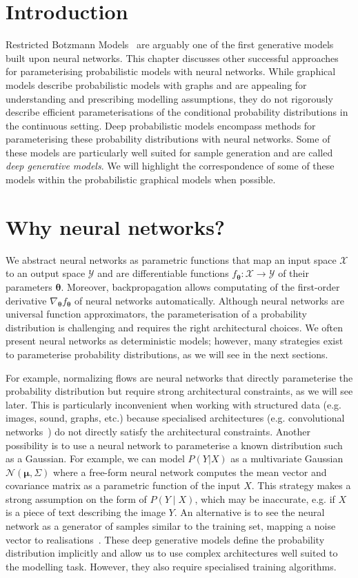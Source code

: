 \section{Introduction}
Restricted Botzmann Models~\citep{hinton2002training} are arguably one of the first generative models built upon neural networks. This chapter discusses other successful approaches for parameterising probabilistic models with neural networks. While graphical models describe probabilistic models with graphs and are appealing for understanding and prescribing modelling assumptions, they do not rigorously describe efficient parameterisations of the conditional probability distributions in the continuous setting. Deep probabilistic models encompass methods for parameterising these probability distributions with neural networks. Some of these models are particularly well suited for sample generation and are called \textit{deep generative models}. We will highlight the correspondence of some of these models within the probabilistic graphical models when possible.

\section{Why neural networks?}
We abstract neural networks as parametric functions that map an input space $\mathcal{X}$ to an output space $\mathcal{Y}$ and are differentiable functions $f_{\bm{\theta}}: \mathcal{X} \rightarrow \mathcal{Y}$ of their parameters $\bm{\theta}$. Moreover, backpropagation allows computating of the first-order derivative $\nabla_{\bm{\theta}}f_{\bm{\theta}}$ of neural networks automatically. Although neural networks are universal function approximators, the parameterisation of a probability distribution is challenging and requires the right architectural choices. We often present neural networks as deterministic models; however, many strategies exist to parameterise probability distributions, as we will see in the next sections.

For example, normalizing flows are neural networks that directly parameterise the probability distribution but require strong architectural constraints, as we will see later. This is particularly inconvenient when working with structured data (e.g. images, sound, graphs, etc.) because specialised architectures (e.g. convolutional networks~\citep{lecun1995convolutional}) do not directly satisfy the architectural constraints. Another possibility is to use a neural network to parameterise a known distribution such as a Gaussian. For example, we can model $P(Y|X)$ as a multivariate Gaussian $\mathcal{N}(\bm{\mu}, \Sigma)$ where a free-form neural network computes the mean vector and covariance matrix as a parametric function of the input $X$. This strategy makes a strong assumption on the form of $P(Y\mid X)$, which may be inaccurate, e.g. if $X$ is a piece of text describing the image $Y$. An alternative is to see the neural network as a generator of samples similar to the training set, mapping a noise vector to realisations~\citep{goodfellow2020generative}. These deep generative models define the probability distribution implicitly and allow us to use complex architectures well suited to the modelling task. However, they also require specialised training algorithms.

